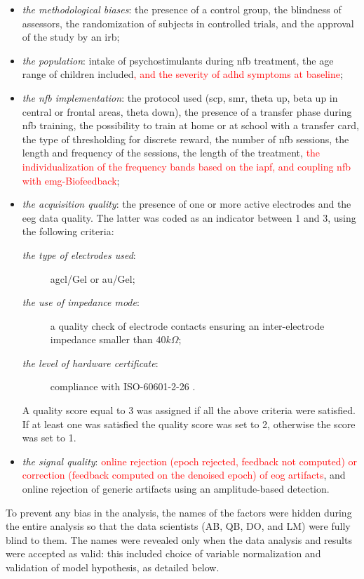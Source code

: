\begin{itemize}
  \item \emph{the methodological biases}: the presence of a control group, the blindness of assessors, 
  the randomization of subjects in controlled trials, and the approval of the study by an \gls{irb};
  \item \emph{the population}: intake of psychostimulants during \gls{nfb} treatment, the age range of children
  included\textcolor{red}{, and the severity of \gls{adhd} symptoms at baseline};
  \item \emph{the \gls{nfb} implementation}: the protocol used (\gls{scp}, \gls{smr}, 
  theta up, beta up in central or frontal areas, theta down), the presence of a transfer phase during \gls{nfb} training, the 
	possibility to train at home or at school with a transfer card, 
  the type of thresholding for discrete reward, the number of \gls{nfb} sessions, the length and frequency of the sessions, the length of
  the treatment, \textcolor{red}{the individualization of the frequency bands based on the \gls{iapf}, and coupling \gls{nfb} with \gls{emg}-Biofeedback};
  \item \emph{the acquisition quality}: the presence of one or more active electrodes and the \gls{eeg} data quality. 
  The latter was coded as an indicator between 1 and 3, using the following criteria:   
	\begin{description}
	  \item[\emph{the type of electrodes used}:] \gls{agcl}/Gel or \gls{au}/Gel;
    \item[\emph{the use of impedance mode}:] a quality check of electrode contacts
		ensuring an inter-electrode impedance smaller than $40k\Omega$;  
    \item[\emph{the level of hardware certificate}:] compliance with ISO-60601-2-26 \citep{ISO-60601-2-26:2012}.
	\end{description}
	A quality score equal to 3 was assigned if all the above criteria were satisfied. If at least one was satisfied
	the quality score was set to 2, otherwise the score was set to 1.
  \item \emph{the signal quality}: \textcolor{red}{online rejection (epoch rejected, feedback not computed) or correction (feedback computed on the denoised epoch) of \gls{eog} artifacts},
	and online rejection of generic artifacts using an amplitude-based detection.
\end{itemize}	

To prevent any bias in the analysis, the names of the factors were hidden during the entire analysis so that the data scientists (AB, QB,
DO, and LM) were fully blind to them. The names were revealed only when the data analysis and results were accepted as valid: 
this included choice of variable normalization and validation of model hypothesis, as detailed below.

